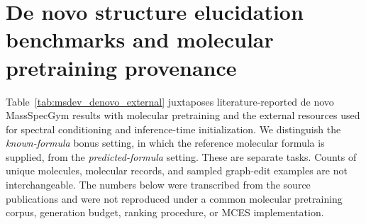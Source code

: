 \clearpage
\section{De novo structure elucidation benchmarks and molecular pretraining provenance}
\label{sec:msdev_denovo_literature}

Table~\ref{tab:msdev_denovo_external} juxtaposes literature-reported de novo
MassSpecGym results with molecular pretraining and the external resources
used for spectral conditioning and inference-time initialization. We distinguish
the \emph{known-formula} bonus setting, in which the reference molecular formula
is supplied, from the \emph{predicted-formula} setting. These are separate tasks.
Counts of unique molecules, molecular records, and sampled graph-edit examples
are not interchangeable. The numbers below were transcribed from the source
publications and were not reproduced under a common molecular pretraining
corpus, generation budget, ranking procedure, or MCES implementation.
